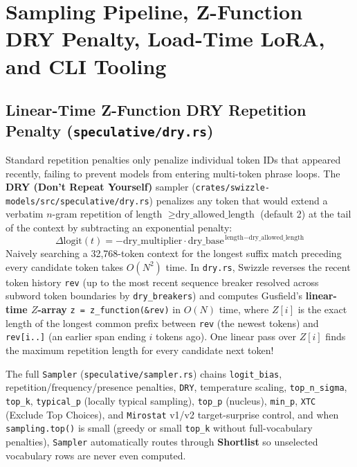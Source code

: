\documentclass[10pt,a4paper]{article}
\theoremstyle{swzstyle}
\newcommand{\code}[1]{\texttt{#1}}
\begin{document}
\section{Sampling Pipeline, Z-Function DRY Penalty, Load-Time LoRA, and CLI Tooling}

\subsection{Linear-Time Z-Function DRY Repetition Penalty (\texttt{speculative/dry.rs})}

Standard repetition penalties only penalize individual token IDs that appeared recently, failing to prevent models from entering multi-token phrase loops. The \textbf{DRY (Don't Repeat Yourself)} sampler (\code{crates/swizzle-models/src/speculative/dry.rs}) penalizes any token that would extend a verbatim $n$-gram repetition of length $\ge \text{dry\_allowed\_length}$ (default 2) at the tail of the context by subtracting an exponential penalty:
\begin{equation}
  \Delta \text{logit}(t) = -\text{dry\_multiplier} \cdot \text{dry\_base}^{\,\text{length} - \text{dry\_allowed\_length}}
\end{equation}
Naively searching a 32,768-token context for the longest suffix match preceding every candidate token takes $O(N^2)$ time. In \code{dry.rs}, Swizzle reverses the recent token history \code{rev} (up to the most recent sequence breaker resolved across subword token boundaries by \code{dry\_breakers}) and computes Gusfield's \textbf{linear-time $Z$-array} \code{z = z\_function(\&rev)} in $O(N)$ time, where $Z[i]$ is the exact length of the longest common prefix between \code{rev} (the newest tokens) and \code{rev[i..]} (an earlier span ending $i$ tokens ago). One linear pass over $Z[i]$ finds the maximum repetition length for every candidate next token!

The full \code{Sampler} (\code{speculative/sampler.rs}) chains \code{logit\_bias}, repetition/frequency/presence penalties, \code{DRY}, temperature scaling, \code{top\_n\_sigma}, \code{top\_k}, \code{typical\_p} (locally typical sampling), \code{top\_p} (nucleus), \code{min\_p}, \code{XTC} (Exclude Top Choices), and \code{Mirostat} v1/v2 target-surprise control, and when \code{sampling.top()} is small (greedy or small \code{top\_k} without full-vocabulary penalties), \code{Sampler} automatically routes through \textbf{Shortlist} so unselected vocabulary rows are never even computed.
\end{document}
